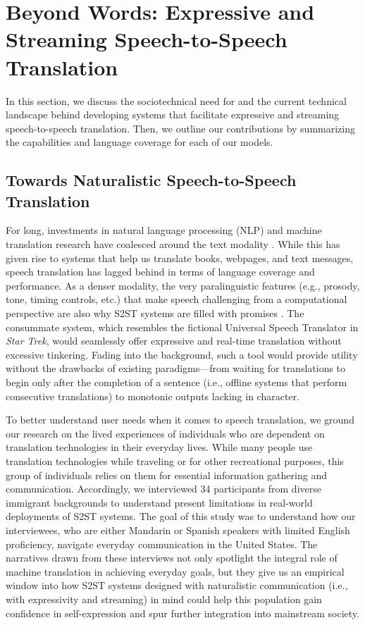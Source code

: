 \section{Beyond Words: Expressive and Streaming Speech-to-Speech Translation}\label{sec:problem}

In this section, we discuss the sociotechnical need for and the current technical landscape behind developing systems that facilitate expressive and streaming speech-to-speech translation. Then, we outline our contributions by summarizing the capabilities and language coverage for each of our models.

\subsection{Towards Naturalistic Speech-to-Speech Translation}

For long, investments in natural language processing (NLP) and machine translation research have coalesced around the text modality \citep{nllb2022,SeamlessM4TArXiv}. While this has given rise to systems that help us translate books, webpages, and text messages, speech translation has lagged behind in terms of language coverage and performance. As a denser modality, the very paralinguistic features (e.g., prosody, tone, timing controls, etc.) that make speech challenging from a computational perspective are also why S2ST systems are filled with promises \citep{kraut1992task,nakamura2009overcoming}. The consummate system, which resembles the fictional Universal Speech Translator in \textit{Star Trek}, would seamlessly offer expressive and real-time translation without excessive tinkering. Fading into the background, such a tool would provide utility without the drawbacks of existing paradigms—from waiting for translations to begin only after the completion of a sentence (i.e., offline systems that perform consecutive translations)
to monotonic outputs lacking in character.

To better understand user needs when it comes to speech translation, we ground our research on the lived experiences of individuals who are dependent on translation technologies in their everyday lives. While many people use translation technologies while traveling or for other recreational purposes, this group of individuals relies on them for essential information gathering and communication. Accordingly, we interviewed 34 participants from diverse immigrant backgrounds to understand present limitations in real-world deployments of S2ST systems. The goal of this study was to understand how our interviewees, who are either Mandarin or Spanish speakers with limited English proficiency, navigate everyday communication in the United States. The narratives drawn from these interviews not only spotlight the integral role of machine translation in achieving everyday goals, but they give us an empirical window into how S2ST systems designed with naturalistic communication (i.e., with expressivity and streaming) in mind could help this population gain confidence in self-expression and spur further integration into mainstream society.

